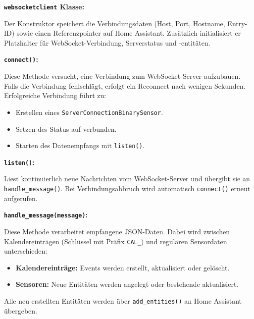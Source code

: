 \vspace{0.5cm}

\textbf{\texttt{websocketclient} Klasse:}

Der Konstruktor speichert die Verbindungsdaten (Host, Port, Hostname, Entry-ID) sowie einen Referenzpointer auf Home Assistant. Zusätzlich initialisiert er Platzhalter für WebSocket-Verbindung, Serverstatus und -entitäten.

\vspace{0.5cm}

\textbf{\texttt{connect()}:}

Diese Methode versucht, eine Verbindung zum WebSocket-Server aufzubauen. Falls die Verbindung fehlschlägt, erfolgt ein Reconnect nach wenigen Sekunden. Erfolgreiche Verbindung führt zu:

\begin{itemize}
  \item Erstellen eines \texttt{ServerConnectionBinarySensor}.\\
  \item Setzen des Status auf verbunden.\\
  \item Starten des Datenempfangs mit \texttt{listen()}.
\end{itemize}

\vspace{0.5cm}

\textbf{\texttt{listen()}:}

Liest kontinuierlich neue Nachrichten vom WebSocket-Server und übergibt sie an \texttt{handle\_message()}. Bei Verbindungsabbruch wird automatisch \texttt{connect()} erneut aufgerufen.

\vspace{0.5cm}

\textbf{\texttt{handle\_message(message)}:}

Diese Methode verarbeitet empfangene JSON-Daten. Dabei wird zwischen Kalendereinträgen (Schlüssel mit Präfix \texttt{CAL\_}) und regulären Sensordaten unterschieden:

\begin{itemize}
  \item \textbf{Kalendereinträge:} Events werden erstellt, aktualisiert oder gelöscht.\\
  \item \textbf{Sensoren:} Neue Entitäten werden angelegt oder bestehende aktualisiert.
\end{itemize}

Alle neu erstellten Entitäten werden über \texttt{add\_entities()} an Home Assistant übergeben.

